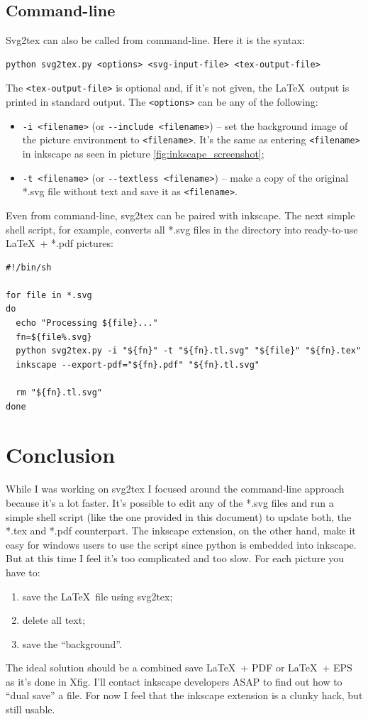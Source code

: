 \documentclass[a4paper,12pt]{article}
\begin{document}
\subsection{Command-line}

Svg2tex can also be called from command-line. Here it is the syntax:
\begin{verbatim}
python svg2tex.py <options> <svg-input-file> <tex-output-file>
\end{verbatim}
The \texttt{<tex-output-file>} is optional and, if it's not given, the \LaTeX\ output is printed in standard output. The \texttt{<options>} can be any of the following:
\begin{itemize}
  \item \texttt{-i <filename>} (or \texttt{-{}-include <filename>}) -- set the background image of the picture environment to \texttt{<filename>}. It's the same as entering \texttt{<filename>} in inkscape as seen in picture \ref{fig:inkscape_screenshot};
  \item \texttt{-t <filename>} (or \texttt{-{}-textless <filename>}) -- make a copy of the original *.svg file without text and save it as \texttt{<filename>}.
\end{itemize}
Even from command-line, svg2tex can be paired with inkscape. The next simple shell script, for example, converts all *.svg files in the directory into ready-to-use \LaTeX\ + *.pdf pictures:
{\small
\begin{verbatim}
#!/bin/sh

for file in *.svg
do
  echo "Processing ${file}..."
  fn=${file%.svg}
  python svg2tex.py -i "${fn}" -t "${fn}.tl.svg" "${file}" "${fn}.tex"
  inkscape --export-pdf="${fn}.pdf" "${fn}.tl.svg"

  rm "${fn}.tl.svg"
done
\end{verbatim}
}

\section{Conclusion}

While I was working on svg2tex I focused around the command-line approach because it's a lot faster. It's possible to edit any of the *.svg files and run a simple shell script (like the one provided in this document) to update both, the *.tex and *.pdf counterpart. The inkscape extension, on the other hand, make it easy for windows users to use the script since python is embedded into inkscape. But at this time I feel it's too complicated and too slow. For each picture you have to:
\begin{enumerate}
  \item save the \LaTeX\ file using svg2tex;
  \item delete all text;
  \item save the ``background''.
\end{enumerate}
The ideal solution should be a combined save \LaTeX\ + PDF or \LaTeX\ + EPS as it's done in Xfig. I'll contact inkscape developers ASAP to find out how to ``dual save'' a file. For now I feel that the inkscape extension is a clunky hack, but still usable.
\end{document}
